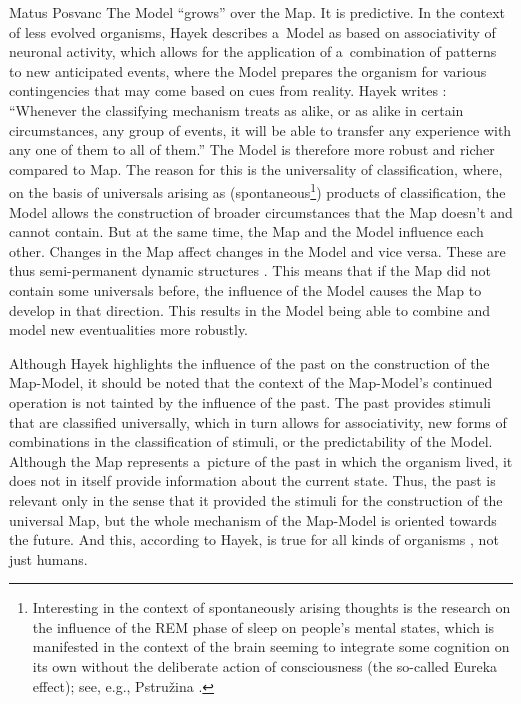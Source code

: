 \begin{artengenv}{Matus Posvanc}
The Model ``grows'' over the Map. It is predictive. In the context of less evolved organisms, Hayek describes a~Model as based on associativity of neuronal activity, which allows for the application of a~combination of patterns to new anticipated events, where the Model prepares the organism for various contingencies that may come based on cues from reality. Hayek writes 
\parencite[][sec.5.87]{Hayek1952Sensory}: %
 ``Whenever the classifying mechanism treats as alike, or as alike in certain circumstances, any group of events, it will be able to transfer any experience with any one of them to all of them.'' The Model is therefore more robust and richer compared to Map. The reason for this is the universality of classification, where, on the basis of universals arising as (spontaneous\footnote{Interesting in the context of spontaneously arising thoughts is the research on the influence of the REM phase of sleep on people's mental states, which is manifested in the context of the brain seeming to integrate some cognition on its own without the deliberate action of consciousness (the so-called Eureka effect); see, e.g., Pstružina 
\parencite*[][]{Pstruzina1994Etudy}.%
}) products of classification, the Model allows the construction of broader circumstances that the Map doesn't and cannot contain. But at the same time, the Map and the Model influence each other. Changes in the Map affect changes in the Model and vice versa. These are thus semi-permanent dynamic structures 
\parencite[][sec.5.43]{Hayek1952Sensory}. %
 This means that if the Map did not contain some universals before, the influence of the Model causes the Map to develop in that direction. This results in the Model being able to combine and model new eventualities more robustly.



Although Hayek highlights the influence of the past on the construction of the Map-Model, it should be noted that the context of the Map-Model's continued operation is not tainted by the influence of the past. The past provides stimuli that are classified universally, which in turn allows for associativity, new forms of combinations in the classification of stimuli, or the predictability of the Model. Although the Map 
\parencite[][sec.5.42]{Hayek1952Sensory} %
 represents a~picture of the past in which the organism lived, it does not in itself provide information about the current state. Thus, the past is relevant only in the sense that it provided the stimuli for the construction of the universal Map, but the whole mechanism of the Map-Model is oriented towards the future. And this, according to Hayek, is true for all kinds of organisms 
\parencite[][sec.5.61]{Hayek1952Sensory}, %
 not just humans.




\end{artengenv}
